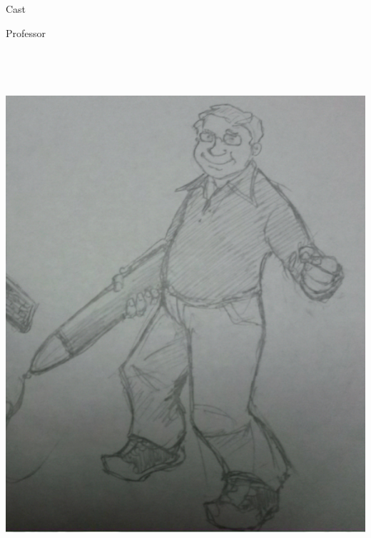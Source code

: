\documentclass[12pt]{report}
\begin{document}
\begin{section}{Cast}
\begin{subsection}{Professor}
\includegraphics[height=8in]{professor.png}

\end{subsection}
\clearpage

\end{section}
\end{document}
